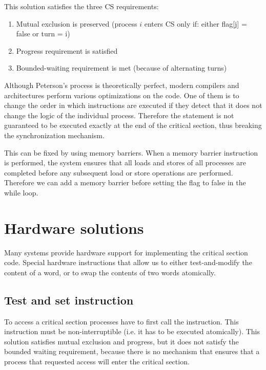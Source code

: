 
This solution satisfies the three CS requirements:
\begin{enumerate}
    \item Mutual exclusion is preserved (process $i$ enters CS only if: either flag[j] = false or turn = i)
    \item Progress requirement is satisfied
    \item Bounded-waiting requirement is met (because of alternating turns)
\end{enumerate}

Although Peterson's process is theoretically perfect, modern compilers and architectures perform various optimizations on the code. One of them is to change the order in which instructions are executed if they detect that it does not change the logic of the individual process. Therefore the  statement is not guaranteed to be executed exactly at the end of the critical section, thus breaking the synchronization mechanism.

This can be fixed by using memory barriers. When a memory barrier instruction is performed, the system ensures that all loads and stores of all processes are completed before any subsequent load or store operations are performed. Therefore we can add a memory barrier before setting the flag to false in the while loop.

\section{Hardware solutions}
Many systems provide hardware support for implementing the critical section code. Special hardware instructions that allow us to either test-and-modify the content of a word, or to swap the contents of two words atomically.

\subsection{Test and set instruction}
To access a critical section processes have to first call the  instruction. This instruction must be non-interruptible (i.e. it has to be executed atomically).
This solution satisfies mutual exclusion and progress, but it does not satisfy the bounded waiting requirement, because there is no mechanism that ensures that a process that requested access will enter the critical section.

